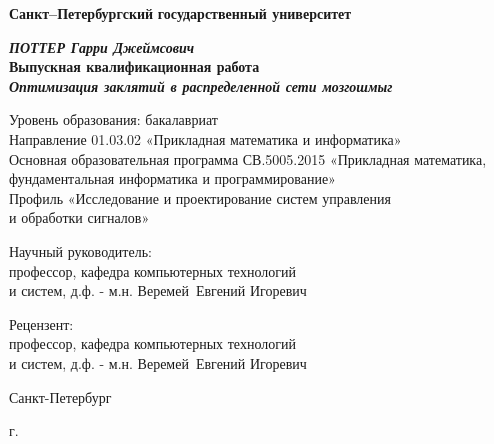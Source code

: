 
\begin{titlepage}
\begin{center}
\textbf{Санкт--Петербургский}
\textbf{государственный университет}

\vspace{35mm}

\textbf{\textit{\large ПОТТЕР Гарри Джеймсович}} \\[8mm]
\textbf{\large Выпускная квалификационная работа}\\[3mm]
\textbf{\textit{\large Оптимизация заклятий в распределенной сети
мозгошмыг}}

\vspace{20mm}
Уровень образования: бакалавриат\\
Направление 01.03.02 «Прикладная математика и информатика»\\
Основная образовательная программа СВ.5005.2015
«Прикладная математика, фундаментальная информатика и программирование»\\
Профиль «Исследование и проектирование систем управления\\ и обработки сигналов»\\[30mm]


\begin{flushright}
{Научный руководитель:} \\
профессор, кафедра компьютерных технологий \\ и систем, д.ф. - м.н.  Веремей~Евгений Игоревич
\end{flushright}
\begin{flushright}
{Рецензент:} \\
профессор, кафедра компьютерных технологий \\и систем, д.ф. - м.н.  Веремей~Евгений Игоревич
\end{flushright}

\vfill 

{Санкт-Петербург}
\par{\the\year{} г.}
\end{center}
\end{titlepage}
\restoregeometry
\addtocounter{page}{1}
